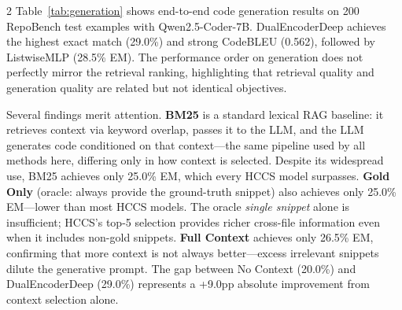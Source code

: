 \documentclass[11pt,a4paper]{article}
\begin{document}
\begin{multicols}{2}
Table~\ref{tab:generation} shows end-to-end code generation results on 200 RepoBench test examples with Qwen2.5-Coder-7B. DualEncoderDeep achieves the highest exact match (29.0\%) and strong CodeBLEU (0.562), followed by ListwiseMLP (28.5\% EM). The performance order on generation does not perfectly mirror the retrieval ranking, highlighting that retrieval quality and generation quality are related but not identical objectives.

\begin{center}
\label{tab:generation}
\end{center}

Several findings merit attention. \textbf{BM25} is a standard lexical RAG baseline: it retrieves context via keyword overlap, passes it to the LLM, and the LLM generates code conditioned on that context---the same pipeline used by all methods here, differing only in how context is selected. Despite its widespread use, BM25 achieves only 25.0\% EM, which every HCCS model surpasses. \textbf{Gold Only} (oracle: always provide the ground-truth snippet) also achieves only 25.0\% EM---lower than most HCCS models. The oracle \textit{single snippet} alone is insufficient; HCCS's top-5 selection provides richer cross-file information even when it includes non-gold snippets. \textbf{Full Context} achieves only 26.5\% EM, confirming that more context is not always better---excess irrelevant snippets dilute the generative prompt. The gap between No Context (20.0\%) and DualEncoderDeep (29.0\%) represents a +9.0pp absolute improvement from context selection alone.


\end{multicols}
\end{document}
